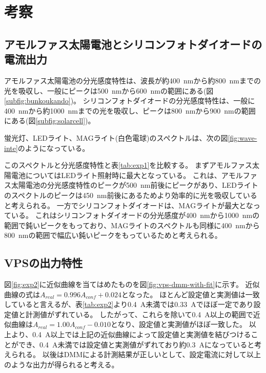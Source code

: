 \documentclass[../../../main]{subfiles}
\begin{document}
\section{考察}

\subsection{アモルファス太陽電池とシリコンフォトダイオードの電流出力}
アモルファス太陽電池の分光感度特性は、波長が約\SI{400}{\nano m}から約\SI{800}{\nano m}までの光を吸収し、一般にピークは\SI{500}{nm}から\SI{600}{nm}の範囲にある\cite{evaluation-photo,amorfous-si}(図\ref{subfig:bunkoukando})。
シリコンフォトダイオードの分光感度特性は、一般に\SI{400}{\nano m}から約\SI{1000}{\nano m}までの光を吸収し、ピークは\SI{800}{nm}から\SI{900}{nm}の範囲にある(図\ref{subfig:solarcell})。

蛍光灯、LEDライト、MAGライト(白色電球)のスペクトルは、次の図\ref{fig:wave-inte}のようになっている\cite{spectra}。

このスペクトルと分光感度特性と表\ref{tab:exp1}を比較する。
まずアモルファス太陽電池についてはLEDライト照射時に最大となっている。
これは、アモルファス太陽電池の分光感度特性のピークが\SI{500}{nm}前後にピークがあり、LEDライトのスペクトルのピークは\SI{450}{nm}前後にあるためより効率的に光を吸収していると考えられる。
一方でシリコンフォトダイオードは、MAGライトが最大となっている。
これはシリコンフォトダイオードの分光感度が\SI{400}{nm}から\SI{1000}{nm}の範囲で鈍いピークをもっており、MAGライトのスペクトルも同様に\SI{400}{nm}から\SI{800}{nm}の範囲で幅広い鈍いピークをもっているためと考えられる。

\subsection{VPSの出力特性}\label{subsec:consi-vps}
図\ref{fig:exp2}に近似曲線を当てはめたものを図\ref{fig:vps-dmm-with-fit}に示す。
近似曲線の式は$A_{real}=0.996A_{conf}+0.024$となった。
ほとんど設定値と実測値は一致していると言えるが、表\ref{tab:exp2}より\SI{0.4}{A}未満では\SI{0.33}{A}でほぼ一定であり設定値と計測値がずれている。
したがって、これらを除いて\SI{0.4}{A}以上の範囲で近似曲線は$A_{real}=1.00A_{conf}-0.010$となり、設定値と実測値がほぼ一致した。
以上より、\SI{0.4}{A}以上では上記の近似曲線によって設定値と実測値を結びつけることができ、\SI{0.4}{A}未満では設定値と実測値がずれており約\SI{0.3}{A}になっていると考えられる。
以後はDMMによる計測結果が正しいとして、設定電流に対して以上のような出力が得られると考える。

\end{document}
